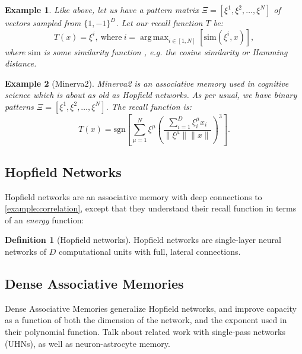 \documentclass{article}
\DeclareMathOperator*{\argmax}{arg\,max}
\newtheorem{example}{Example}[subsection]
\theoremstyle{definition}
\newtheorem{definition}{Definition}[subsection]
\begin{document}
\begin{example}\label{example:argmax-am}
  Like above, let us have a pattern matrix $\Xi = [\xi^1, \xi^2, \dots, \xi^N]$ of
  vectors sampled from $\{1, -1\}^D$. Let our recall function $T$ be:
  \begin{equation}
    T(x) = \xi^i,~\text{where}~i = \argmax_{i \in [1, N]} [\text{sim}(\xi^i, x)],
  \end{equation}
  where $\text{sim}$ is some similarity function \parencite{kelly_memory_2017},
  e.g. the cosine similarity or Hamming distance.
\end{example}

\begin{example}[Minerva2]
  Minerva2 \parencite{hintzman_minerva_1984} is an associative memory used in cognitive
  science which is about as old as Hopfield networks. As per usual, we have
  binary patterns $\Xi = [\xi^1, \xi^2, \dots, \xi^N]$. The recall function is:
  \begin{equation}
    T(x) = \text{sgn} \left[ \sum^N_{\mu=1} \xi^\mu \left( \frac{\sum^D_{i=1} \xi^\mu_i x_i}{\|\xi^\mu\| \|x\|} \right)^3 \right].
  \end{equation}
\end{example}

\subsection{Hopfield Networks}\label{sec:hopfield-networks}

Hopfield networks \parencites{hopfield_neural_1982,hopfield_neurons_1984} are an associative
memory with deep connections to \autoref{example:correlation}, except that they 
understand their recall function in terms of an \textit{energy} function:

\begin{definition}[Hopfield networks]
  Hopfield networks are single-layer neural networks of $D$ computational units
  with full, lateral connections.
\end{definition}

\subsection{Dense Associative Memories}\label{sec:dense-associative-memory}

Dense Associative Memories generalize Hopfield networks, and improve
capacity as a function of both the dimension of the network, and the 
exponent used in their polynomial function. Talk about related
work with single-pass networks (UHNs), as well as neuron-astrocyte memory.
\end{document}
